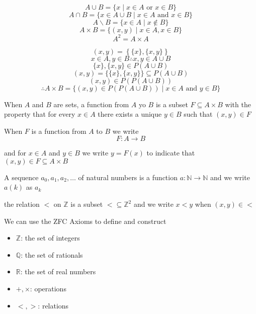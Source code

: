 
\begin{exmp}
$$A \cup B = \{x\mid x\in A \text{ or }x\in B\}$$
$$A \cap B = \{x\in A\cup B \mid x\in A \text{ and } x\in B\}$$
$$A \backslash B = \{x\in A\mid x\notin B\}$$
$$A\times B = \{(x,y)\mid x\in A,x\in B\}$$
$$A^2=A\times A$$
\end{exmp}

$$(x,y) = \left\{\{x\},\{x,y\}\right\}$$
$$x\in A, y\in B \therefore x,y\in A\cup B$$
$$\{x\},\{x,y\}\in P(A\cup B)$$
$$(x,y) = \{\{x\},\{x,y\}\} \subseteq P(A\cup B)$$
$$(x,y) \in P(P(A\cup B))$$
$$\therefore A\times B = \{(x,y) \in P(P(A\cup B)) \mid x\in A \text{ and } y\in B\}$$


When $A$ and $B$ are sets, a function from $A$ yo $B$ is a subset $F \subseteq A\times B$ with  the property that for every $x\in A$ there exists a unique $y\in B$ such that $(x,y)\in F$

When $F$ is a function from $A$ to $B$ we write $$F\colon A\to B$$

and for $x\in A$ and $y\in B$ we write $y=F(x)$ to indicate that $(x,y) \in F\subseteq A\times B$

A sequence $a_0,a_1,a_2,\dots$ of natural numbers is a function $a\colon \mathbb{N}\to\mathbb{N}$ and we write $a(k)$ as $a_k$

the relation $<$ on $\mathbb{Z}$ is a subset $< \subseteq \mathbb{Z}^2$ and we write $x<y$ when $(x,y)\in <$


\topic{}
We can use the ZFC Axioms to define and construct 
\begin{itemize}

\item $\mathbb{Z}$: the set of integers
\item $\mathbb{Q}$: the set of rationals
\item $\mathbb{R}$: the set of real numbers 
\item $+,\times$: operations
\item $<,>$: relations
\end{itemize}









